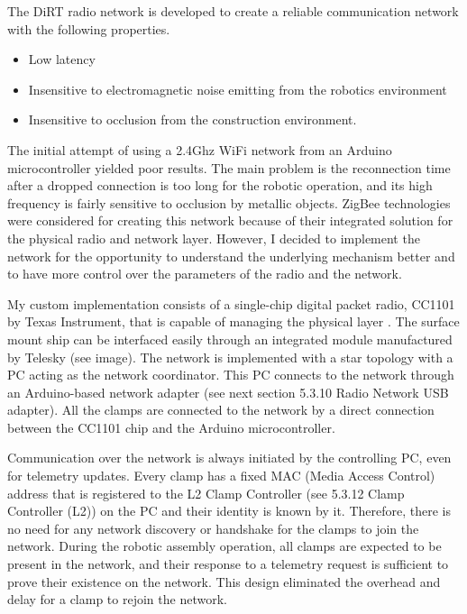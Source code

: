 The DiRT radio network is developed to create a reliable communication network with the following properties.
\begin{itemize}
    \item Low latency
    \item Insensitive to electromagnetic noise emitting from the robotics environment
    \item Insensitive to occlusion from the construction environment. 
\end{itemize}

The initial attempt of using a 2.4Ghz WiFi network from an Arduino microcontroller yielded poor results. The main problem is the reconnection time after a dropped connection is too long for the robotic operation, and its high frequency is fairly sensitive to occlusion by metallic objects. ZigBee technologies were considered for creating this network because of their integrated solution for the physical radio and network layer. However, I decided to implement the network for the opportunity to understand the underlying mechanism better and to have more control over the parameters of the radio and the network.


My custom implementation consists of a single-chip digital packet radio, CC1101 by Texas Instrument, that is capable of managing the physical layer \parencite{texasinstrumentsCC1101LowPowerSub12023}. The surface mount ship can be interfaced easily through an integrated module manufactured by Telesky (see image). The network is implemented with a star topology with a PC acting as the network coordinator. This PC connects to the network through an Arduino-based network adapter (see next section 5.3.10 Radio Network USB adapter). All the clamps are connected to the network by a direct connection between the CC1101 chip and the Arduino microcontroller. 

Communication over the network is always initiated by the controlling PC, even for telemetry updates. Every clamp has a fixed MAC (Media Access Control) address that is registered to the L2 Clamp Controller (see 5.3.12 Clamp Controller (L2)) on the PC and their identity is known by it. Therefore, there is no need for any network discovery or handshake for the clamps to join the network. During the robotic assembly operation, all clamps are expected to be present in the network, and their response to a telemetry request is sufficient to prove their existence on the network. This design eliminated the overhead and delay for a clamp to rejoin the network.


